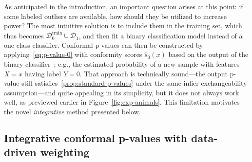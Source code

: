 \documentclass[11pt]{article}
\begin{document}
As anticipated in the introduction, an important question arises at this point: if some labeled outliers are available, how should they be utilized to increase power?
The most intuitive solution is to include them in the training set, which thus becomes $\mathcal{D}_0^{\mathrm{train}} \cup \mathcal{D}_1$, and then fit a binary classification model instead of a one-class classifier. Conformal p-values can then be constructed by applying~\eqref{eq:p-value-0} with conformity scores $\hat{s}_0(x)$ based on the output of the binary classifier~\cite{vovk2003mondrian}; e.g., the estimated probability of a new sample with features $X=x$ having label $Y=0$.
That approach is technically sound---the output p-value still satisfies~\eqref{prop:standard-p-values} under the same inlier exchangeability assumption---and quite appealing in its simplicity, but it does not always work well, as previewed earlier in Figure~\ref{fig:exp-animals}. 
This limitation motivates the novel {\it integrative} method presented below.
 



\subsection{Integrative conformal p-values with data-driven weighting} \label{sec:adaptive-weighting}
\end{document}
